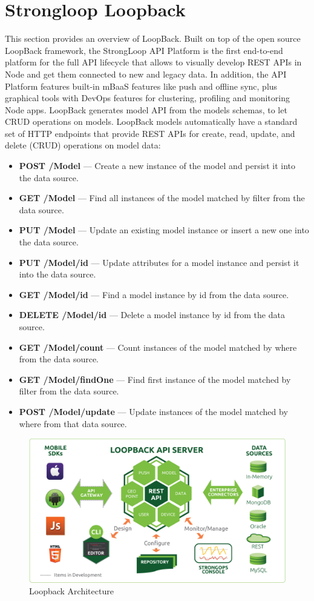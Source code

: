 \section{Strongloop Loopback}
\label{sec:strongloop_loopback}
This section provides an overview of LoopBack.
\newline
Built on top of the open source LoopBack framework, the StrongLoop API Platform is the first end-to-end platform for the full API lifecycle that allows to visually develop REST APIs in Node and get them connected to new and legacy data. In addition, the API Platform features built-in mBaaS features like push and offline sync, plus graphical tools with DevOps features for clustering, profiling and monitoring Node apps.
\newline
LoopBack generates model API from the models schemas, to let CRUD operations on models.
LoopBack models automatically have a standard set of HTTP endpoints that provide REST APIs for create, read, update, and delete (CRUD) operations on model data:
\begin{itemize}
\item \textbf{POST /Model} — Create a new instance of the model and persist it into the data source.
\item \textbf{GET /Model} — Find all instances of the model matched by filter from the data source.
\item \textbf{PUT /Model} — Update an existing model instance or insert a new one into the data source.
\item \textbf{PUT /Model/id} — Update attributes for a model instance and persist it into the data source.
\item \textbf{GET /Model/id} — Find a model instance by id from the data source.
\item \textbf{DELETE /Model/id } — Delete a model instance by id from the data source.
\item \textbf{GET /Model/count} — Count instances of the model matched by where from the data source.
\item \textbf{GET /Model/findOne} — Find first instance of the model matched by filter from the data source.
\item \textbf{POST /Model/update} — Update instances of the model matched by where from that data source.
\end{itemize}
\begin{figure}[htb]
 \centering
 \includegraphics[width=0.9\linewidth]{images/chapter3/loopback_architecture.jpg}\hfill
 \caption[Loopback Architecture]{Loopback Architecture}
 \label{fig:loopback_architecture}
\end{figure}
